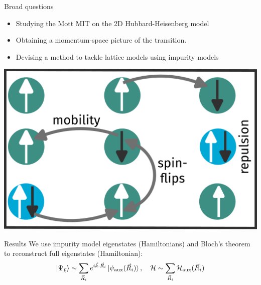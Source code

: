 \documentclass[aspectratio=169]{beamer}
\begin{document}
\begin{frame}{Broad questions}
\begin{minipage}{0.5\textwidth}
\begin{itemize}
	\item Studying the Mott MIT on the 2D Hubbard-Heisenberg model\\[10pt]
	\item Obtaining a momentum-space picture of the transition.\\[10pt]
	\item Devising a method to tackle lattice models using impurity models
\end{itemize}
\end{minipage}
\begin{minipage}{0.4\textwidth}
\includegraphics[width=\textwidth]{hubbard.pdf}
\end{minipage}
\end{frame}

\begin{frame}{Results}
\flushleft
We use impurity model eigenstates (Hamiltonians) and \alert{Bloch's theorem} to reconstruct full eigenstates (Hamiltonian):
\[\ket{\Psi_{\vec k}} \sim \sum_{\vec R_i} e^{i \vec{k}\cdot\vec{R}_i} \ket{\psi_\text{aux}(\vec R_i)},\quad\mathcal{H} \sim \sum_{\vec R_i} \mathcal{H}_\text{aux}(\vec R_i)\]
\vspace*{\fill}
\end{frame}
\end{document}
